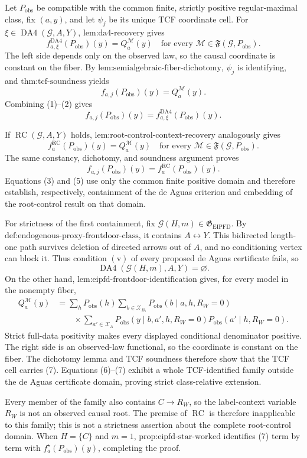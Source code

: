 Let \(P_{\mathrm{obs}}\) be compatible with the common finite, strictly positive regular-maximal class, fix \((a,y)\), and let \(\psi_j\) be its unique TCF coordinate cell.  For \(\xi\in\operatorname{DA4}(\mathcal G,A,Y)\), \(\text{lem:da4-recovery}\) gives
\[
f^{\mathrm{DA4}}_{a,\xi}(P_{\mathrm{obs}})(y)
=Q_a^{\mathcal M}(y)
\quad\text{for every }\mathcal M\in\mathfrak F(\mathcal G,P_{\mathrm{obs}}).
\tag{1}
\]
The left side depends only on the observed law, so the causal coordinate is constant on the fiber.  By \(\text{lem:semialgebraic-fiber-dichotomy}\), \(\psi_j\) is identifying, and \(\text{thm:tcf-soundness}\) yields
\[
f_{a,j}(P_{\mathrm{obs}})(y)=Q_a^{\mathcal M}(y).
\tag{2}
\]
Combining (1)--(2) gives
\[
f_{a,j}(P_{\mathrm{obs}})(y)
=f^{\mathrm{DA4}}_{a,\xi}(P_{\mathrm{obs}})(y).
\tag{3}
\]

If \(\operatorname{RC}(\mathcal G,A,Y)\) holds, \(\text{lem:root-control-context-recovery}\) analogously gives
\[
f_a^{\mathrm{RC}}(P_{\mathrm{obs}})(y)
=Q_a^{\mathcal M}(y)
\quad\text{for every }\mathcal M\in\mathfrak F(\mathcal G,P_{\mathrm{obs}}).
\tag{4}
\]
The same constancy, dichotomy, and soundness argument proves
\[
f_{a,j}(P_{\mathrm{obs}})(y)=f_a^{\mathrm{RC}}(P_{\mathrm{obs}})(y).
\tag{5}
\]
Equations (3) and (5) use only the common finite positive domain and therefore establish, respectively, containment of the de Aguas criterion and embedding of the root-control result on that domain.

For strictness of the first containment, fix \(\mathcal G(H,m)\in\mathfrak G_{\mathrm{EIPFD}}\).  By \(\text{def:endogenous-proxy-frontdoor-class}\), it contains \(A\leftrightarrow Y\).  This bidirected length-one path survives deletion of directed arrows out of \(A\), and no conditioning vertex can block it.  Thus condition \(\mathrm{(v)}\) of every proposed de Aguas certificate fails, so
\[
\operatorname{DA4}(\mathcal G(H,m),A,Y)=\varnothing.
\tag{6}
\]
On the other hand, \(\text{lem:eipfd-frontdoor-identification}\) gives, for every model in the nonempty fiber,
\[
\begin{aligned}
Q_a^{\mathcal M}(y)
&=\sum_hP_{\mathrm{obs}}(h)
\sum_{b\in\mathcal X_{B_1}}P_{\mathrm{obs}}(b\mid a,h,R_W=0)\\
&\qquad\times\sum_{a'\in\mathcal X_A}
P_{\mathrm{obs}}(y\mid b,a',h,R_W=0)
P_{\mathrm{obs}}(a'\mid h,R_W=0).
\end{aligned}
\tag{7}
\]
Strict full-data positivity makes every displayed conditional denominator positive.  The right side is an observed-law functional, so the coordinate is constant on the fiber.  The dichotomy lemma and TCF soundness therefore show that the TCF cell carries (7).  Equations (6)--(7) exhibit a whole TCF-identified family outside the de Aguas certificate domain, proving strict class-relative extension.

Every member of the family also contains \(C\to R_W\), so the label-context variable \(R_W\) is not an observed causal root.  The premise of \(\operatorname{RC}\) is therefore inapplicable to this family; this is not a strictness assertion about the complete root-control domain.  When \(H=\{C\}\) and \(m=1\), \(\text{prop:eipfd-star-worked}\) identifies (7) term by term with \(f_a^\star(P_{\mathrm{obs}})(y)\), completing the proof.